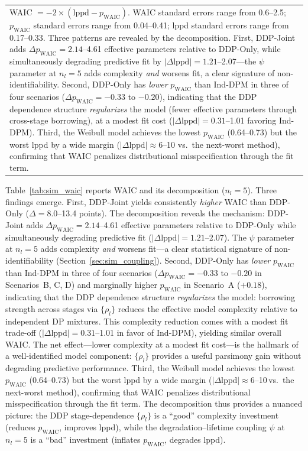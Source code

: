 \documentclass[a4paper,fleqn,longmktitle]{cas-sc}
\begin{document}
\begin{table}
\begin{tabular}{lcccc}
\multicolumn{5}{p{\textwidth}}{\footnotesize WAIC $= -2 \times (\text{lppd} - p_{\mathrm{WAIC}})$. WAIC standard errors range from 0.6--2.5; $p_{\mathrm{WAIC}}$ standard errors range from 0.04--0.41; lppd standard errors range from 0.17--0.33. Three patterns are revealed by the decomposition. First, DDP-Joint adds $\Delta p_{\mathrm{WAIC}} = 2.14$--4.61 effective parameters relative to DDP-Only, while simultaneously degrading predictive fit by $|\Delta\text{lppd}| = 1.21$--2.07---the $\psi$ parameter at $n_l=5$ adds complexity \emph{and} worsens fit, a clear signature of non-identifiability. Second, DDP-Only has \emph{lower} $p_{\mathrm{WAIC}}$ than Ind-DPM in three of four scenarios ($\Delta p_{\mathrm{WAIC}} = -0.33$ to $-0.20$), indicating that the DDP dependence structure \emph{regularizes} the model (fewer effective parameters through cross-stage borrowing), at a modest fit cost ($|\Delta\text{lppd}| = 0.31$--1.01 favoring Ind-DPM). Third, the Weibull model achieves the lowest $p_{\mathrm{WAIC}}$ (0.64--0.73) but the worst lppd by a wide margin ($|\Delta\text{lppd}| \approx 6$--10 vs.\ the next-worst method), confirming that WAIC penalizes distributional misspecification through the fit term.}
\end{tabular}
\end{table}

Table~\ref{tab:sim_waic} reports WAIC and its decomposition ($n_l = 5$). Three findings emerge. First, DDP-Joint yields consistently \emph{higher} WAIC than DDP-Only ($\Delta = 8.0$--13.4 points). The decomposition reveals the mechanism: DDP-Joint adds $\Delta p_{\mathrm{WAIC}} = 2.14$--4.61 effective parameters relative to DDP-Only while simultaneously degrading predictive fit ($|\Delta\text{lppd}| = 1.21$--2.07). The $\psi$ parameter at $n_l=5$ adds complexity \emph{and} worsens fit---a clear statistical signature of non-identifiability (Section~\ref{sec:sim_coupling}). Second, DDP-Only has \emph{lower} $p_{\mathrm{WAIC}}$ than Ind-DPM in three of four scenarios ($\Delta p_{\mathrm{WAIC}} = -0.33$ to $-0.20$ in Scenarios~B, C, D) and marginally higher $p_{\mathrm{WAIC}}$ in Scenario~A ($+0.18$), indicating that the DDP dependence structure \emph{regularizes} the model: borrowing strength across stages via $\{\rho_l\}$ reduces the effective model complexity relative to independent DP mixtures. This complexity reduction comes with a modest fit trade-off ($|\Delta\text{lppd}| = 0.31$--1.01 in favor of Ind-DPM), yielding similar overall WAIC. The net effect---lower complexity at a modest fit cost---is the hallmark of a well-identified model component: $\{\rho_l\}$ provides a useful parsimony gain without degrading predictive performance. Third, the Weibull model achieves the lowest $p_{\mathrm{WAIC}}$ (0.64--0.73) but the worst lppd by a wide margin ($|\Delta\text{lppd}| \approx 6$--10$\,$vs.\ the next-worst method), confirming that WAIC penalizes distributional misspecification through the fit term. The decomposition thus provides a nuanced picture: the DDP stage-dependence $\{\rho_l\}$ is a ``good'' complexity investment (reduces $p_{\mathrm{WAIC}}$, improves lppd), while the degradation--lifetime coupling $\psi$ at $n_l=5$ is a ``bad'' investment (inflates $p_{\mathrm{WAIC}}$, degrades lppd).
\end{document}
